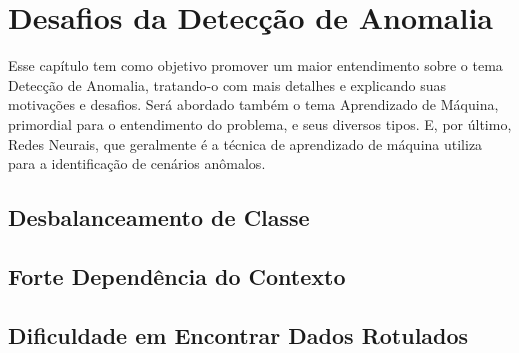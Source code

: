 \chapter{Desafios da Detecção de Anomalia }\label{chp:DESAFIOS_DETECCAO_DE_ANOMALIA}

Esse capítulo tem como objetivo promover um maior entendimento sobre o tema Detecção de Anomalia, tratando-o com mais detalhes e explicando suas motivações e desafios. Será abordado também o tema Aprendizado de Máquina, primordial para o entendimento do problema, e seus diversos tipos. E, por último, Redes Neurais, que geralmente é a técnica de aprendizado de máquina utiliza para a identificação de cenários anômalos.


\section{Desbalanceamento de Classe}

\section{Forte Dependência do Contexto}

\section{Dificuldade em Encontrar Dados Rotulados}

